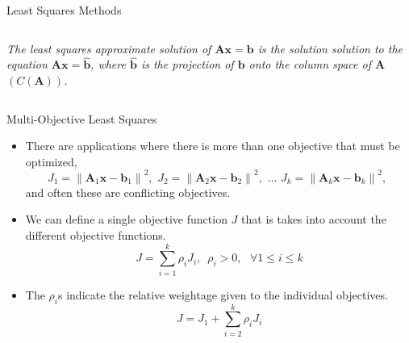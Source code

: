 \documentclass[aspectratio=169]{beamer}
\begin{document}
\begin{frame}[t]{Least Squares Methods}
\begin{columns}
\begin{column}{0.55\textwidth}
\begin{footnotesize}
\textit{The least squares approximate solution of $\mathbf{Ax} = \mathbf{b}$ is the solution solution to the equation $\mathbf{Ax} = \hat{\mathbf{b}}$, where $\hat{\mathbf{b}}$ is the projection of $\mathbf{b}$ onto the column space of $\mathbf{A}$ $\left(C\left(\mathbf{A}\right)\right)$.}
\end{footnotesize}
\end{column}
\end{columns}
\end{frame}


\begin{frame}[t]{Multi-Objective Least Squares}
\begin{small}
\begin{itemize}
    \item There are applications where there is more than one objective that must be optimized,
    \[ J_1 = \left\lVert \mathbf{A}_1\mathbf{x} - \mathbf{b}_1 \right\rVert^2, \,\,
    J_2 = \left\lVert \mathbf{A}_2\mathbf{x} - \mathbf{b}_2 \right\rVert^2, \,\,
    \ldots \,\,
    J_k = \left\lVert \mathbf{A}_k\mathbf{x} - \mathbf{b}_k \right\rVert^2, \,\,
    \]
    and often these are conflicting objectives.

    \item We can define a single objective function $J$ that is takes into account the different objective functions.
    \[ J = \sum_{i=1}^k\rho_iJ_i, \,\,\, \rho_i > 0, \,\,\,\, \forall 1 \leq i \leq k\]

    \item The $\rho_i$s indicate the relative weightage given to the individual objectives.
    \[ J = J_1 + \sum_{i=2}^k\rho_iJ_i \]
\end{itemize}
\end{small}
\end{frame}
\end{document}
